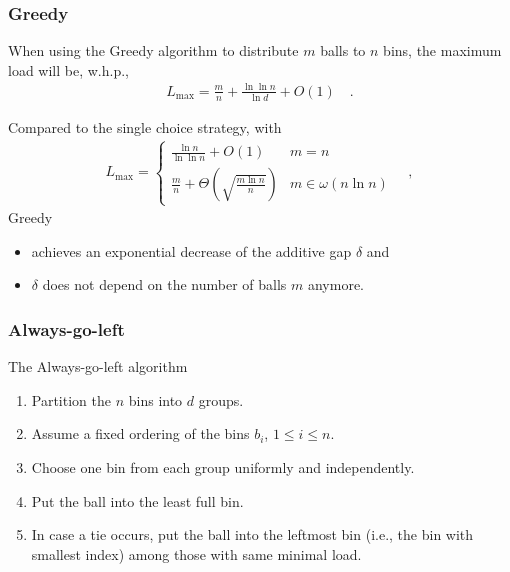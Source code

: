 \documentclass[serif,professionalfonts]{beamer}
\newcommand\load{L_{\mathrm{max}}}
\newcommand\scalefac{0.55}
\newcommand\ballsize{5mm}
\newcommand\nrbins{6}
\newcommand\padding{0.1*\ballsize}
\newcommand\binheight{5*\balldiameter}
\newcommand\bingap{1.6*\balldiameter}
\newcommand\balldiameter{2*\ballsize}
\newcommand\iA[2][0]{
	\path (\nbid) edge[insert, bend left=#1] (#2);
}
\newcommand\bin[1]{
	\path node[topflat, xshift=#1*\bingap*\scalefac, above, yshift=-\padding*\scalefac]  {};
}
\newcommand\bins{
	\foreach \ibin in {1,...,\nrbins}
		\bin{\ibin};
}
\newcommand\setNode[2]{
	\draw let \n1 ={#1#2} in node[circle, minimum size = \ballsize](n\n1) at (#1*\bingap,#2*\balldiameter-\ballsize) {};
}
\newcommand\nodes{
	\foreach \i in {1,...,6}
		\foreach \j in {1,...,5}
			\setNode{\i}{\j};
}
\newcommand\ball[2]{
	\shade[ballstyle] (#1*\bingap,#2*\balldiameter-\ballsize) circle (\ballsize) {};
}
\newcommand\nbid{nb}
\newcommand\newball{
	\draw node[circle, minimum size = \ballsize](\nbid) at (0*\bingap,6*\balldiameter-\ballsize) {};
	\ball{0}{6};
}
\newcommand\putinbin[2]{
	\ifnum #2 > 0
		\foreach \nrballs in {1,...,#2}
 			\ball{#1}{\nrballs};
 	\fi
}
\newcounter{index}
\newcommand\balls[1]{%
	\getargsC{#1}%
  	\setcounter{index}{0}%
  	\whiledo{\theindex < \narg}{%
    		\stepcounter{index}%
    		\putinbin{\theindex}{\csname arg\romannumeral\theindex\endcsname}%
  	}%
}
\newcommand\bab[1]{%
	\bins
	\nodes
	\balls{#1}
}
\newcommand\groupSep[1]{
	\draw[thick, color=red!40] let \n1={(#1+0.5)*\bingap} in (\n1,-\ballsize) -- (\n1,\binheight +\ballsize);
}
\begin{document}
\begin{frame}
\frametitle{Greedy}
\begin{theorem}
When using the \alert{Greedy} algorithm to distribute $m$ balls to $n$ bins, the maximum load will be, w.h.p.,
\begin{align*}
\load = \frac{m}{n} + \frac{\ln \ln n}{\ln d} + O(1) \quad .
\end{align*}
\end{theorem}
\pause
\medskip
Compared to the \alert{single choice} strategy, with 
\begin{align*}
\load = 
	\begin{cases}
    \frac{\ln n}{\ln\ln n} + O(1)              & m = n \\
    \frac{m}{n} + \Theta\left(\sqrt{\frac{m\ln n}{n}} \right)              & m \in \omega(n \ln n)
    \end{cases} \quad ,
\end{align*}
\alert{Greedy}
\begin{itemize}
\item achieves an \alert{exponential decrease} of the additive gap $\delta$ and
\item $\delta$ does \alert{not depend on} the number of balls \alert{$m$} anymore.
\end{itemize}
\end{frame}

\begin{frame}[shrink]
\frametitle{Always-go-left}
\begin{exampleblock}{The Always-go-left algorithm}
\begin{enumerate}
\item Partition the $n$ bins into $d$ groups.
\item Assume a fixed ordering of the bins $b_i$, $1\leq i \leq n$.
\item Choose one bin from each group uniformly and independently.
\item Put the ball into the least full bin.
\item In case a tie occurs, put the ball into the leftmost bin (i.e., the bin with smallest index) among those with same minimal load.
\end{enumerate}
\end{exampleblock}

\begin{center}
\end{center}

\end{frame}
\end{document}
